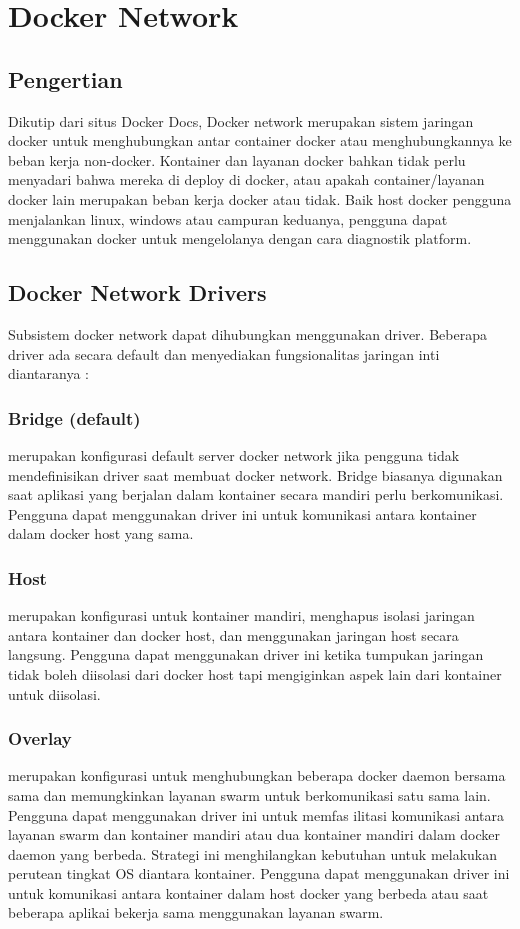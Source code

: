 \chapter{Docker Network}
\section{Pengertian}
Dikutip dari situs Docker Docs, Docker network merupakan sistem jaringan docker untuk menghubungkan antar container docker atau menghubungkannya ke beban kerja non-docker.
Kontainer dan layanan docker bahkan tidak perlu menyadari bahwa mereka di deploy di docker, atau apakah container/layanan docker lain merupakan beban kerja docker atau tidak.
Baik host docker pengguna menjalankan linux, windows atau campuran keduanya, pengguna dapat menggunakan docker untuk mengelolanya dengan cara diagnostik platform.

\section{Docker Network Drivers}
Subsistem docker network dapat dihubungkan menggunakan driver. Beberapa driver ada secara default dan menyediakan fungsionalitas jaringan inti diantaranya :
\subsection{Bridge (default)}
merupakan konfigurasi default server docker network jika pengguna tidak mendefinisikan driver saat membuat docker network. Bridge biasanya digunakan saat aplikasi 
yang berjalan dalam kontainer secara mandiri perlu berkomunikasi. Pengguna dapat menggunakan driver ini untuk komunikasi antara kontainer dalam docker host yang sama.
\subsection{Host}
merupakan konfigurasi untuk kontainer mandiri, menghapus isolasi jaringan antara kontainer dan docker host, dan menggunakan jaringan host secara langsung. Pengguna dapat menggunakan driver ini
ketika tumpukan jaringan tidak boleh diisolasi dari docker host tapi mengiginkan aspek lain dari kontainer untuk diisolasi.
\subsection{Overlay}
merupakan konfigurasi untuk menghubungkan beberapa docker daemon bersama sama dan memungkinkan layanan swarm untuk berkomunikasi satu sama lain. Pengguna dapat menggunakan driver ini untuk memfas
ilitasi 
komunikasi antara layanan swarm dan kontainer mandiri atau dua kontainer mandiri dalam docker daemon yang berbeda. Strategi ini menghilangkan kebutuhan untuk melakukan perutean tingkat OS diantara kontainer.
Pengguna dapat menggunakan driver ini untuk komunikasi antara kontainer dalam host docker yang berbeda atau saat beberapa aplikai bekerja sama menggunakan layanan swarm.
